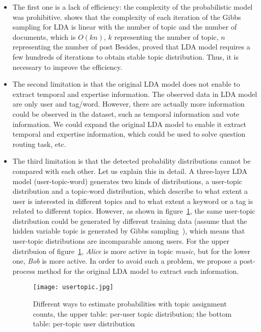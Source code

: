 \begin{itemize}
  \item The first one is a lack of efficiency: the complexity of the probabilistic model was prohibitive. \cite{chp7ldatimecomplexity} shows that the complexity of each iteration of the Gibbs sampling for LDA is linear with the number of topic and the number of documents, which is $O(kn)$, $k$ representing the number of topic, $n$ representing the number of post Besides, \cite{griffiths2004finding} proved that LDA model requires a few hundreds of iterations to obtain stable topic distribution. Thus, it is necessary to improve the efficiency.
  \item The second limitation is that the original LDA model does not enable to extract temporal and expertise information. The observed data in LDA model are only user and tag/word. However, there are actually more information could be observed in the dataset, such as temporal information and vote information. We could expand the original LDA model to enable it extract temporal and expertise information, which could be used to solve question routing task, etc.
  \item The third limitation is that the detected probability distributions cannot be compared with each other.  Let us explain this in detail. A three-layer LDA model (user-topic-word) generates two kinds of distributions, a user-topic distribution and a topic-word distribution, which describe to what extent a user is interested in different topics and to what extent a keyword or a tag is related to different topics. 
However, as shown in figure~\ref{fig:usertopic}, the same user-topic distribution could be generated by different training data (assume that the hidden variable topic is generated by Gibbs sampling~\cite{griffiths2004finding}), which means that user-topic distributions are incomparable among users. For the upper distribuion of figure~\ref{fig:usertopic}, \emph{Alice} is more active in topic \emph{music}, but for the lower one, \emph{Bob} is more active. In order to avoid such a problem, we propose a post-process method for the original LDA model to extract such information. 

\begin{figure}
\centering
\texttt{[image: usertopic.jpg]}  
\caption{Different ways to estimate probabilities with topic assignment counts, the upper table: per-user topic distribution; the bottom table: per-topic user distribution}
\label{fig:usertopic} 
\end{figure}
\end{itemize}

